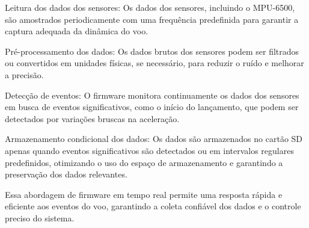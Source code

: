 Leitura dos dados dos sensores: Os dados dos sensores, incluindo o MPU-6500, são amostrados periodicamente com uma frequência predefinida para garantir a captura adequada da dinâmica do voo.

Pré-processamento dos dados: Os dados brutos dos sensores podem ser filtrados ou convertidos em unidades físicas, se necessário, para reduzir o ruído e melhorar a precisão.

Detecção de eventos: O firmware monitora continuamente os dados dos sensores em busca de eventos significativos, como o início do lançamento, que podem ser detectados por variações bruscas na aceleração.

Armazenamento condicional dos dados: Os dados são armazenados no cartão SD apenas quando eventos significativos são detectados ou em intervalos regulares predefinidos, otimizando o uso do espaço de armazenamento e garantindo a preservação dos dados relevantes.

Essa abordagem de firmware em tempo real permite uma resposta rápida e eficiente aos eventos do voo, garantindo a coleta confiável dos dados e o controle preciso do sistema.


%
%
%


